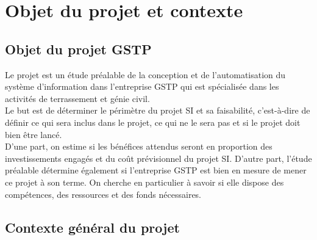 \section{Objet du projet et contexte}

\subsection{Objet du projet GSTP}
Le projet est un étude préalable de la conception et de l'automatisation du système d'information dans l'entreprise GSTP qui est spécialisée dans les activités de terrassement et génie civil.\\

Le but est de déterminer le périmètre du projet SI et sa faisabilité, c’est-à-dire de définir ce qui sera inclus dans le projet, ce qui ne le sera pas et si le projet doit bien être lancé.\\

D’une part, on estime si les bénéfices attendus seront en proportion des investissements engagés et du coût prévisionnel du projet SI.
D’autre part, l’étude préalable détermine également si l’entreprise GSTP est bien en mesure de mener ce projet à son terme. On cherche en particulier à savoir si elle dispose des compétences, des ressources et des fonds nécessaires.\\




\subsection{Contexte général du projet}

